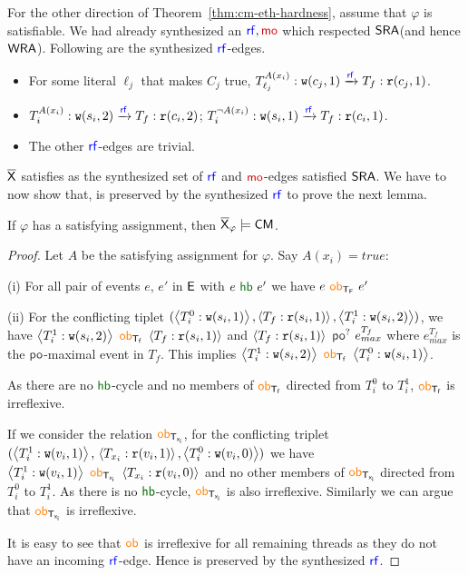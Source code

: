  For the other direction of Theorem~\ref{thm:cm-eth-hardness}, assume that $\varphi$ is satisfiable. We had  already synthesized an $\rf, \mo$ which respected $\mathsf{SRA}$(and hence $\mathsf{WRA}$). Following are the synthesized $\rf$-edges.
 
 \begin{itemize}
  \item For some literal  $\ell_j$ that makes $C_j$ true,   $T_{\ell_j}^{A(x_i)}: \wt(c_j, 1) \xra{\rf} T_f: \rd(c_j, 1)$.
  \item $T_{i}^{A(x_i)}: \wt(s_i, 2) \xra{\rf} T_f: \rd(c_i, 2)$; $T_{i}^{\neg A(x_i)}: \wt(s_i, 1) \xra{\rf} T_f: \rd(c_i, 1)$. 
  \item The other $\rf$-edges are trivial.
 \end{itemize}
 $\overline{\mathsf{\color{black}X}}$ satisfies \PORF{} as the synthesized set of $\rf$ and $\mo$-edges satisfied $\mathsf{SRA}$. 
 We have to now show that, \OB{} is preserved by the synthesized $\rf$ to prove the next lemma.

\begin{lemma}\label{lem:eth-cm}
If $\varphi$ has a satisfying assignment, then $\overline{\mathsf{\color{black}X}}_\varphi \models \mathsf{CM}$. 
\end{lemma}
\begin{proof}
Let $A$ be the satisfying assignment for $\varphi$. 
Say $A(x_i) = true$:

(i) For all pair of events $e$, $e'$ in $\mathsf{E}$ with $e~\hb~e'$ we have $e~\ob{T_F}~e'$

(ii) For the conflicting tiplet $(\left\langle T_i^0: \mathtt{w}(s_i, 1)\right\rangle, \left\langle T_f: \mathtt{r}(s_i, 1)\right\rangle, \left\langle T_i^1: \mathtt{w}(s_i, 2)\right\rangle)$, we have $\allowbreak\tuple{T_i^1:\allowbreak \wt(s_i, 2)}~\allowbreak \ob{T_f}~\tuple{T_f: \rd(s_i, 1)}$ and $\tuple{T_f: \rd(s_i, 1)}\allowbreak~\po^?~e^{T_f}_{max}$ where $e^{T_f}_{max}$ is the $\po$-maximal event in $T_f$. This implies $\tuple{T_i^1: \wt(s_i, 2)}~\ob{T_f}~\tuple{T_i^0: \wt(s_i, 1)}$. 

As there are no $\hb$-cycle and no members of $\ob{T_f}$ directed from $T_i^0$ to $T_i^1$, $\ob{T_f}$ is irreflexive.

If we consider the relation $\ob{T_{x_i}}$, for the conflicting triplet $(\left\langle T_i^1: \mathtt{w}(v_i, 1)\right\rangle,\\ \left\langle T_{x_i}: \mathtt{r}(v_i,1)\right\rangle, \left\langle T_i^0: \mathtt{w}(v_i, 0)\right\rangle)$ we  have $\tuple{T_i^1: \wt(v_i, 1)}~\ob{T_{x_i}}~\tuple{T_{x_i}: \rd(v_i, 0)}$ and no other members of $\ob{T_{x_i}}$ directed from $T_i^0$ to $T_i^1$. As there is no $\hb$-cycle, $\ob{T_{x_i}}$ is also irreflexive. Similarly we can argue that $\ob{T_{x_i}}$ is irreflexive.

It is easy to see that $\ob{}$ is irreflexive for all remaining threads as they do not have an incoming $\rf$-edge. 
Hence \OB{} is preserved by the synthesized $\rf$.
\end{proof}

